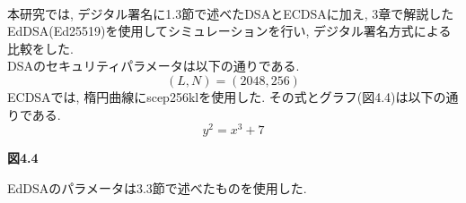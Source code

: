 \\
\indent 本研究では, デジタル署名に1.3節で述べたDSAとECDSAに加え, 
3章で解説したEdDSA(Ed25519)を使用してシミュレーションを行い, 
デジタル署名方式による比較をした. \\ 
\indent DSAのセキュリティパラメータは以下の通りである. \\
\[
  (L,N)=(2048,256)
\]
\indent ECDSAでは, 楕円曲線にscep256klを使用した. 
その式とグラフ(図4.4)は以下の通りである. \\
\[
  y^2 = x^3 + 7 
\]

{\Large\textbf{図4.4}}

\indent EdDSAのパラメータは3.3節で述べたものを使用した.



